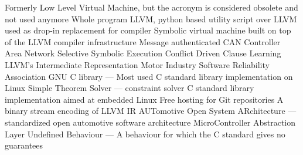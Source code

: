   {Formerly Low Level Virtual Machine, but the acronym is
               considered obsolete and not used anymore}
 {Whole program LLVM, python based utility script over LLVM used
               as drop-in replacement for compiler}
  {Symbolic virtual machine built on top of the LLVM compiler
               infrastructure}
 {Message authenticated CAN}
 {Controller Area Network}
 {Selective Symbolic Execution}
 {Conflict Driven Clause Learning}
 {LLVM's Intermediate Representation}
 {Motor Industry Software Reliability Association}
 {GNU C library --- Most used C standard library implementation on
               Linux}
 {Simple Theorem Solver --- constraint solver}
 {C standard library implementation aimed at embedded Linux}
 {Free hosting for Git repositories}
 {A binary stream encoding of LLVM IR}
 {AUTomotive Open System ARchitecture --- standardized open
                 automotive software architecture}
 {MicroController Abstraction Layer}
 {Undefined Behaviour --- A behaviour for which the C standard gives
            no guarantees}
